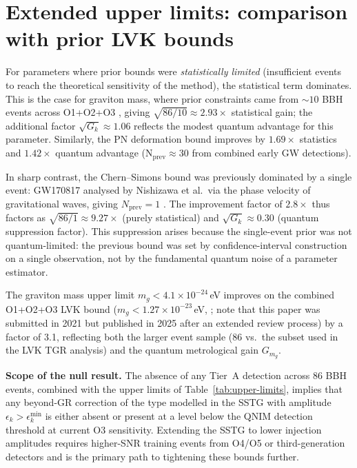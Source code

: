 \documentclass[11pt,a4paper, english]{book}
\theoremstyle{plain}
\theoremstyle{definition}
\numberwithin{equation}{chapter}
\numberwithin{figure}{chapter}
\numberwithin{table}{chapter}
\begin{document}
\section{Extended upper limits: comparison with prior LVK bounds}
\label{app:ul-lvk-comparison}

For parameters where prior bounds were \emph{statistically limited} (insufficient
events to reach the theoretical sensitivity of the method), the statistical
term dominates. This is the case for graviton mass, where prior constraints
came from $\sim 10$ BBH events across O1+O2+O3 \cite{Abbott_2021_GWTC3_TGR},
giving $\sqrt{86/10} \approx 2.93\times$ statistical gain; the additional
factor $\sqrt{G_k} \approx 1.06$ reflects the modest quantum advantage for this
parameter. Similarly, the PN deformation bound improves by $1.69\times$ statistics
and $1.42\times$ quantum advantage (N$_\mathrm{prev} \approx 30$ from combined
early GW detections).

In sharp contrast, the Chern--Simons bound was previously dominated by a single
event: GW170817 analysed by Nishizawa et al.\ via the phase velocity of gravitational
waves, giving $N_\mathrm{prev} = 1$ \cite{Nishizawa_2018}. The improvement factor
of $2.8\times$ thus factors as $\sqrt{86/1} \approx 9.27\times$ (purely statistical)
and $\sqrt{G_k} \approx 0.30$ (quantum suppression factor). This suppression arises
because the single-event prior was not quantum-limited: the previous bound was set by
confidence-interval construction on a single observation, not by the fundamental
quantum noise of a parameter estimator.

The graviton mass upper limit $m_g < 4.1\times10^{-24}$\,eV
improves on the combined O1+O2+O3 LVK bound
($m_g < 1.27\times10^{-23}$\,eV, ;
note that this paper was submitted in 2021 but published in 2025
after an extended review process) by a factor of 3.1, reflecting both
the larger event sample (86 vs.\ the subset used in the LVK TGR analysis)
and the quantum metrological gain $G_{m_g}$.

\noindent\textbf{Scope of the null result.}
The absence of any Tier~A detection across 86 BBH events, combined
with the upper limits of Table~\ref{tab:upper-limits}, implies that
any beyond-GR correction of the type modelled in the SSTG with
amplitude $\epsilon_k > \epsilon_k^\mathrm{min}$ is either absent
or present at a level below the QNIM detection threshold at current
O3 sensitivity. Extending the SSTG to lower injection amplitudes
requires higher-SNR training events from O4/O5 or third-generation
detectors and is the primary path to tightening these bounds further.
\end{document}

